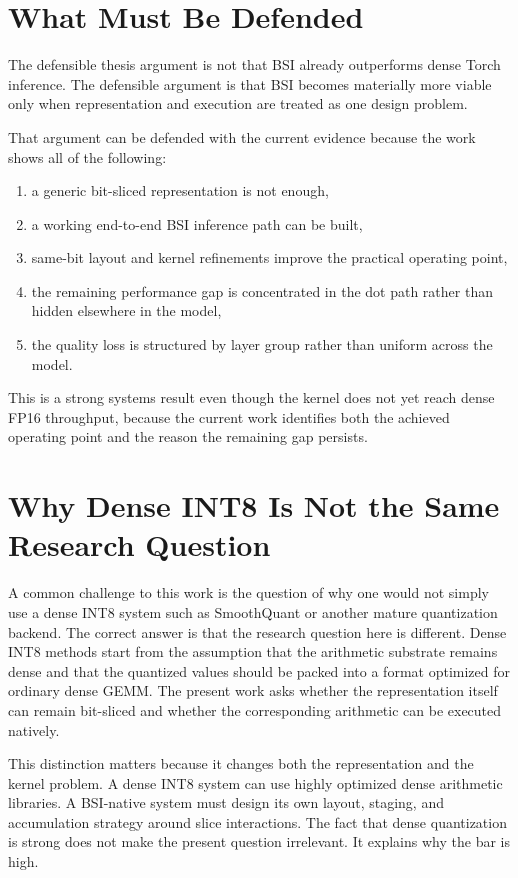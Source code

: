 \section{What Must Be Defended}
The defensible thesis argument is not that BSI already outperforms dense Torch inference. The defensible argument is that BSI becomes materially more viable only when representation and execution are treated as one design problem.

That argument can be defended with the current evidence because the work shows all of the following:

\begin{enumerate}[leftmargin=2em]
\item a generic bit-sliced representation is not enough,
\item a working end-to-end BSI inference path can be built,
\item same-bit layout and kernel refinements improve the practical operating point,
\item the remaining performance gap is concentrated in the dot path rather than hidden elsewhere in the model,
\item the quality loss is structured by layer group rather than uniform across the model.
\end{enumerate}

This is a strong systems result even though the kernel does not yet reach dense FP16 throughput, because the current work identifies both the achieved operating point and the reason the remaining gap persists.

\section{Why Dense INT8 Is Not the Same Research Question}
A common challenge to this work is the question of why one would not simply use a dense INT8 system such as SmoothQuant or another mature quantization backend. The correct answer is that the research question here is different. Dense INT8 methods start from the assumption that the arithmetic substrate remains dense and that the quantized values should be packed into a format optimized for ordinary dense GEMM. The present work asks whether the representation itself can remain bit-sliced and whether the corresponding arithmetic can be executed natively.

This distinction matters because it changes both the representation and the kernel problem. A dense INT8 system can use highly optimized dense arithmetic libraries. A BSI-native system must design its own layout, staging, and accumulation strategy around slice interactions. The fact that dense quantization is strong does not make the present question irrelevant. It explains why the bar is high.

